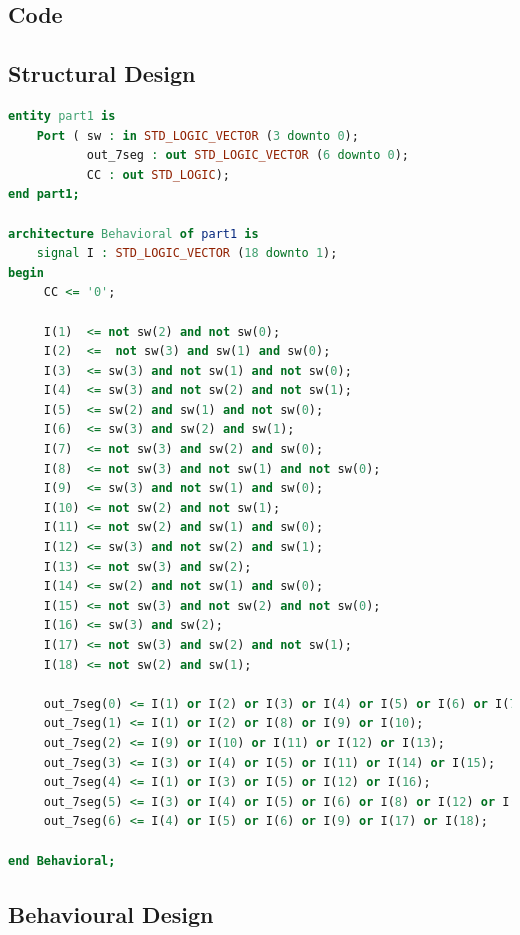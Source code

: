 \documentclass{article}
\begin{document}
\begin{appendices}

\section{Code}

    \subsection{Structural Design}

\begin{lstlisting}[language=VHDL]
entity part1 is
    Port ( sw : in STD_LOGIC_VECTOR (3 downto 0);
           out_7seg : out STD_LOGIC_VECTOR (6 downto 0);
           CC : out STD_LOGIC);
end part1;

architecture Behavioral of part1 is
    signal I : STD_LOGIC_VECTOR (18 downto 1);
begin
     CC <= '0';

     I(1)  <= not sw(2) and not sw(0);
     I(2)  <=  not sw(3) and sw(1) and sw(0);
     I(3)  <= sw(3) and not sw(1) and not sw(0);
     I(4)  <= sw(3) and not sw(2) and not sw(1);
     I(5)  <= sw(2) and sw(1) and not sw(0);
     I(6)  <= sw(3) and sw(2) and sw(1);
     I(7)  <= not sw(3) and sw(2) and sw(0);
     I(8)  <= not sw(3) and not sw(1) and not sw(0);
     I(9)  <= sw(3) and not sw(1) and sw(0);
     I(10) <= not sw(2) and not sw(1);
     I(11) <= not sw(2) and sw(1) and sw(0);
     I(12) <= sw(3) and not sw(2) and sw(1);
     I(13) <= not sw(3) and sw(2);
     I(14) <= sw(2) and not sw(1) and sw(0);
     I(15) <= not sw(3) and not sw(2) and not sw(0);
     I(16) <= sw(3) and sw(2);
     I(17) <= not sw(3) and sw(2) and not sw(1);
     I(18) <= not sw(2) and sw(1);
     
     out_7seg(0) <= I(1) or I(2) or I(3) or I(4) or I(5) or I(6) or I(7);
     out_7seg(1) <= I(1) or I(2) or I(8) or I(9) or I(10);
     out_7seg(2) <= I(9) or I(10) or I(11) or I(12) or I(13);
     out_7seg(3) <= I(3) or I(4) or I(5) or I(11) or I(14) or I(15);
     out_7seg(4) <= I(1) or I(3) or I(5) or I(12) or I(16);
     out_7seg(5) <= I(3) or I(4) or I(5) or I(6) or I(8) or I(12) or I(17);
     out_7seg(6) <= I(4) or I(5) or I(6) or I(9) or I(17) or I(18);

end Behavioral;
\end{lstlisting}

\newpage

    \subsection{Behavioural Design}


\end{appendices}
\end{document}
